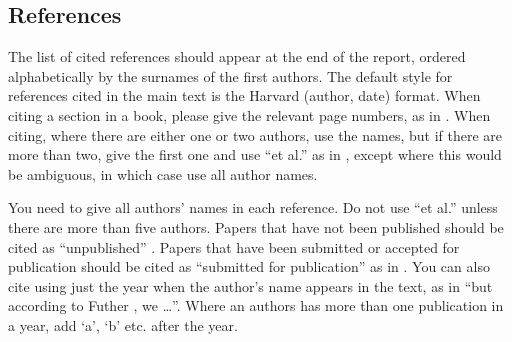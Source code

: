 \documentclass[12pt,a4paper]{article}
\begin{document}
\subsection{References}

The list of cited references should appear at the end of the report, ordered alphabetically by the surnames of the first authors.  The default style for references cited in the main text is the  Harvard (author, date) format.  When citing a section in a book, please give the relevant page numbers, as in \cite[p293]{budgen}.  When citing, where there are either one or two authors, use the names, but if there are more than two, give the first one and use ``et al.'' as in  , except where this would be ambiguous, in which case use all author names.

You need to give all authors' names in each reference.  Do not use ``et al.'' unless there are more than five authors.  Papers that have not been published should be cited as ``unpublished'' \cite{euther}.  Papers that have been submitted or accepted for publication should be cited as ``submitted for publication'' as in \cite{futher} .  You can also cite using just the year when the author's name appears in the text, as in ``but according to Futher \citeyear{futher}, we \dots''.  Where an authors has more than one publication in a year, add `a', `b' etc. after the year.



\end{document}
